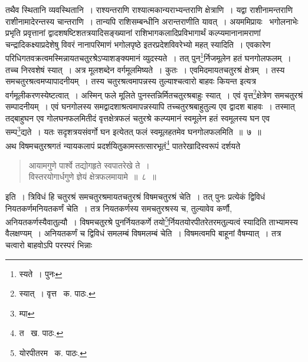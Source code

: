 \documentclass[11pt, openany]{book}
\begin{document}
\noindent तथैव स्थितानि व्यवस्थितानि~। राश्यन्तराणि राश्यात्मकान्यराभ्यन्तराणि क्षेत्राणि~। यद्वा राशीनामन्तराणि राशीनामादेरन्तस्य चान्तराणि~। तान्यपि राशिसम्बन्धीनि अरान्तराणीति यावत्~। अयममिप्रायः \textendash\ भगोलनाभेः प्रभृति प्रवृत्तानां द्वादशषष्टिशतत्रयादिसङ्ख्यानां राशिभागकलादिप्रविभागार्थं कल्प्यमानानामराणां चन्द्रादिकक्ष्याप्रदेशेषु विवरं नानापरिमाणं
भगोलपृष्ठे इतरप्रदेशविवरेभ्यो महत् स्यादिति~। एवकारेण परिधिगतवक्रत्वमस्मिन्नायतचतुरश्रेऽप्याशङ्क्यमानं व्युदस्यते~। तत् पुन\renewcommand{\thefootnote}{१}\footnote{स्यते~। पुनः}र्निजमूलेन हतं घनगोलफलम्~। तच्च निरवशेषं स्यात्~। अत्र मूलशब्देन वर्गमूलमिष्यते~। कुतः~। एवमिदमायतचतुरश्रं क्षेत्रम्~। तस्य समचतुरश्रत्वमप्यापादनीयम्~। तस्य चतुरश्रत्वमापन्नस्य तुल्याश्चत्वारो बाहवः कियन्त इत्यत्र वर्गमूलीकरणस्येष्टत्वात्~। अस्मिन् फले मूलिते पुनस्तन्निर्मितचतुरश्रबाहुः स्यात्~। एवं वृत्त\renewcommand{\thefootnote}{२}\footnote{स्यात्~। वृत्त \textendash\ क. पाठः.}क्षेत्रेण समचतुरश्रं सम्पादनीयम्~। एवं घनगोलस्य समद्वादशाश्रत्वमापन्नस्यापि तच्चतुरश्रबाहुतुल्य एव द्वादश बाहवः~। तस्मात् तद्बाहुघन एव गोलघनफलमितीदं वृत्तक्षेत्रफलं चतुरश्रे कल्प्यमानं स्वमूलेन हतं स्वमूलस्य घन एव सम्प\renewcommand{\thefootnote}{३}\footnote{म्पा}द्यते~। यतः सदृशत्रयसंवर्गो घन इत्येतत् फलं स्वमूलहतमेव घनगोलफलमिति~॥~७~॥\\ 

अथ विषमचतुरश्रगतं न्यायकलापं प्रदर्शयितुकामस्तत्सारभूतं\renewcommand{\thefootnote}{४}\footnote{त \textendash\ ख. पाठः.} पातरेखादिस्वरूपं दर्शयते\textendash

\begin{quote}
{\ab आयामगुणे पार्श्वे तद्योगहृते स्वपातरेखे ते~।\\
विस्तरयोगार्धगुणे ज्ञेयं क्षेत्रफलमायामे~॥~८~॥}
\end{quote}
इति~। त्रिविधं हि चतुरश्रं समचतुरश्रमायतचतुरश्रं विषमचतुरश्रं चेति~। तत् पुनः प्रत्येकं द्विविधं नियतकर्णमनियतकर्णं चेति~। तत्र नियतकर्णस्य समचतुरश्रस्य च, तुल्यावेव कर्णौ, अनियतकर्णस्यैवातुल्यौ~। विषमचतुरश्रे पुनर्नियतकर्णे तयो\renewcommand{\thefootnote}{५}\footnote{योरपीतरम \textendash\ क. पाठः.}र्नियतयोरपीतरेतरमतुल्यत्वं स्यादिति ताभ्यामस्य वैलक्षण्यम्~। अनियतकर्णं च द्विविधं समलम्बं विषमलम्बं चेति~। विषमत्वमपि बाहूनां वैषम्यात्~। तत्र चत्वारो बाहवोऽपि परस्परं भिन्नाः 

\newpage
\end{document}
